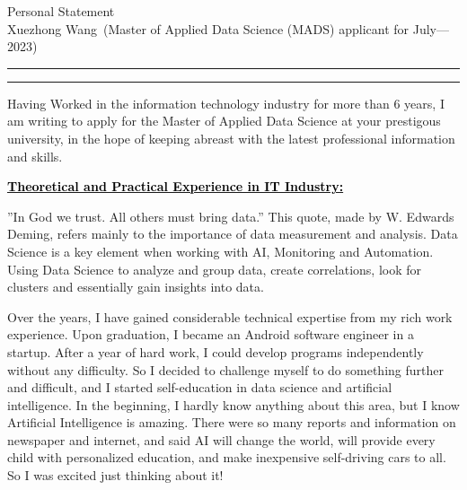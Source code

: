\documentclass[12pt]{article}
\newcommand{\soptitle}{Personal Statement}
\newcommand{\yourname}{Xuezhong Wang}
\newcommand{\statement}[1]{\par\medskip
  \underline{\textcolor{black}{\textbf{#1:}}}\space
}
\begin{document}
\begin{center}\LARGE\soptitle\\
\large \yourname\ (Master of Applied Data Science (MADS) applicant for July---2023)
\end{center}

\hrule
\vspace{1pt}
\hrule height 1pt


\sffamily
\mdseries



\bigskip

 Having Worked in the information technology industry for more than 6 years, I am writing to apply for the Master of Applied Data Science at your prestigous university, in the hope of keeping abreast with the latest professional information and skills.

\bigskip

\statement{Theoretical and Practical Experience in IT Industry}

”In God we trust. All others must bring data.” This quote, made by W. Edwards Deming, refers mainly to the importance of data measurement and analysis. Data Science is a key element when working with AI, Monitoring and Automation. Using Data Science to analyze and group data, create correlations, look for clusters and essentially gain insights into data.

\bigskip

Over the years, I have gained considerable technical expertise from my rich work experience. Upon graduation, I became an Android software engineer in a startup. After a year of hard work, I could develop programs independently without any difficulty. So I decided to challenge myself to do something further and difficult, and I started self-education in data science and artificial intelligence. In the beginning, I hardly know anything about this area, but I know Artificial Intelligence is amazing. There were so many reports and information on newspaper and internet, and said AI will change the world, will provide every child with personalized education, and make inexpensive self-driving cars to all. So I was excited just thinking about it! 
\end{document}

